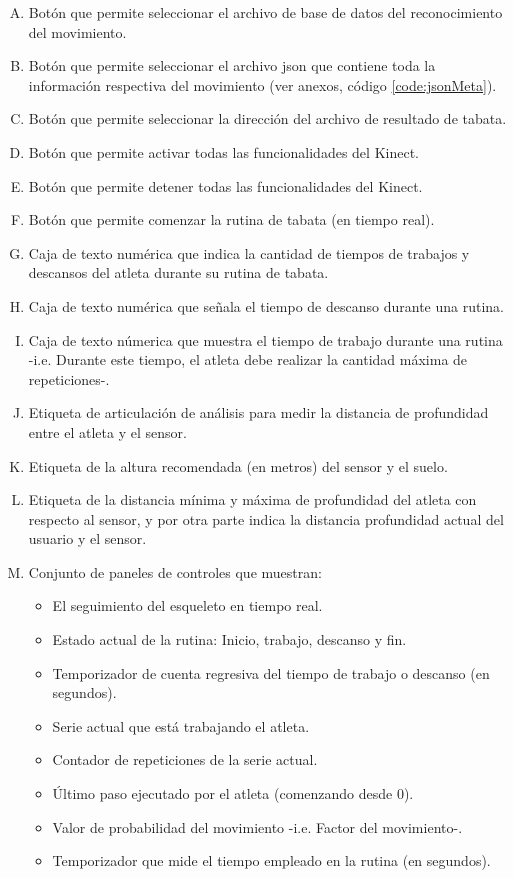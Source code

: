 \begin{enumerate}[A.]
    \item Bot\'on que permite seleccionar el archivo de base de datos del reconocimiento del movimiento.
    \item Bot\'on que permite seleccionar el archivo json que contiene toda la informaci\'on respectiva del movimiento (ver anexos, c\'odigo  \ref{code:jsonMeta}).
    \item Bot\'on que permite seleccionar la direcci\'on del archivo de resultado de tabata.
    \item Bot\'on que permite activar todas las funcionalidades del Kinect.    
    \item Bot\'on que permite detener todas las funcionalidades del Kinect. 
    \item Bot\'on que permite comenzar la rutina de tabata (en tiempo real).
   \item  Caja de texto num\'erica que indica la cantidad de tiempos de trabajos y descansos del atleta durante su rutina de tabata.
   \item  Caja de texto num\'erica que se\~nala el tiempo de descanso durante una rutina.
   \item  Caja de texto n\'umerica que muestra el tiempo de trabajo durante una rutina -i.e. Durante este tiempo, el atleta debe realizar la cantidad m\'axima de repeticiones-.
   \item  Etiqueta de articulaci\'on de an\'alisis para medir la distancia de profundidad entre el atleta y el sensor.
   \item  Etiqueta de la altura  recomendada (en metros)  del sensor y el suelo.
      \item  Etiqueta de la distancia m\'inima y m\'axima de profundidad del atleta con respecto al sensor, y por otra parte indica la distancia profundidad actual del usuario y el sensor.
      \item Conjunto de paneles de controles que muestran:
      \begin{itemize}
            \item  El seguimiento del esqueleto en tiempo real.
            \item  Estado actual de la rutina: Inicio, trabajo, descanso y fin.
            \item  Temporizador de cuenta regresiva del tiempo de trabajo o descanso (en segundos).
             \item  Serie actual que est\'a trabajando el atleta.
             \item  Contador de repeticiones de la serie actual.
              \item \'Ultimo paso ejecutado por el atleta (comenzando desde 0).   
             \item  Valor de probabilidad del movimiento -i.e. Factor del movimiento-.
             \item  Temporizador que mide el tiempo    empleado en la rutina (en segundos).
      \end{itemize}
\end{enumerate}
